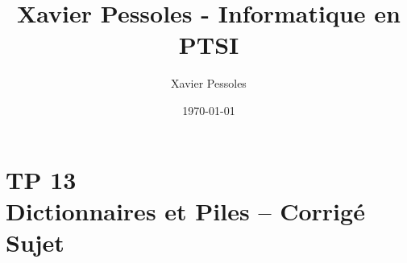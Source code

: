 \documentclass[
	fontsize=10pt, %
	twoside=true, %
]{kaobook}
\newcommand{\repRel}{../../../..}
\newcommand{\repStyle}{\repRel/Style}
\begin{document}

\titlehead{Xavier Pessoles - Informatique en PTSI}
\title[Xavier Pessoles - Informatique en PTSI]{Xavier Pessoles - Informatique en PTSI}
\author[XP]{Xavier Pessoles}
\date{\today}


\begingroup %
\endgroup

%
\mainmatter %
%
%
%
%


\setcounter{margintocdepth}{\sectiontocdepth}
\marginlayout
\graphicspath{{\repStyle/png}}

\pagestyle{xp.scrheadings}


%



\newcommand{\repExo}{}
\newcommand{\nomExo}{}

\livrettrue %
\livrettrue
\colletrue








\chapter*{TP 13 \\ 
Dictionnaires et Piles -- \ifprof Corrigé \else Sujet \fi}
\end{document}
